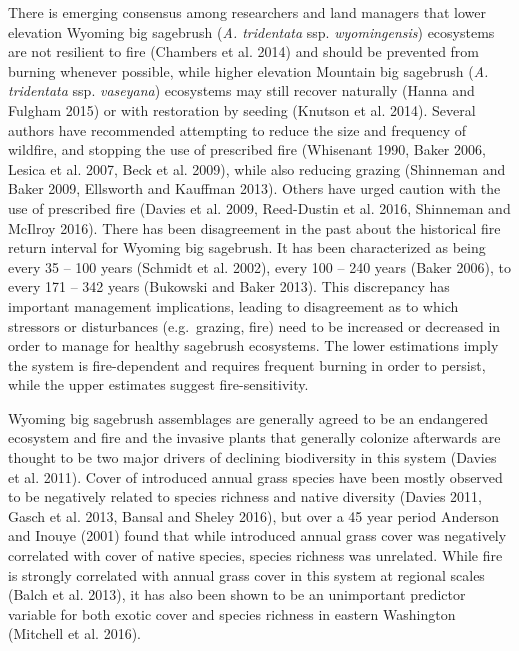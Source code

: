 \documentclass[12pt,]{article}
\begin{document}
There is emerging consensus among researchers and land managers that
lower elevation Wyoming big sagebrush (\emph{A. tridentata} ssp.
\emph{wyomingensis}) ecosystems are not resilient to fire (Chambers et
al. 2014) and should be prevented from burning whenever possible, while
higher elevation Mountain big sagebrush (\emph{A. tridentata} ssp.
\emph{vaseyana}) ecosystems may still recover naturally (Hanna and
Fulgham 2015) or with restoration by seeding (Knutson et al. 2014).
Several authors have recommended attempting to reduce the size and
frequency of wildfire, and stopping the use of prescribed fire
(Whisenant 1990, Baker 2006, Lesica et al. 2007, Beck et al. 2009),
while also reducing grazing (Shinneman and Baker 2009, Ellsworth and
Kauffman 2013). Others have urged caution with the use of prescribed
fire (Davies et al. 2009, Reed-Dustin et al. 2016, Shinneman and McIlroy
2016). There has been disagreement in the past about the historical fire
return interval for Wyoming big sagebrush. It has been characterized as
being every 35 -- 100 years (Schmidt et al. 2002), every 100 -- 240
years (Baker 2006), to every 171 -- 342 years (Bukowski and Baker 2013).
This discrepancy has important management implications, leading to
disagreement as to which stressors or disturbances (e.g.~grazing, fire)
need to be increased or decreased in order to manage for healthy
sagebrush ecosystems. The lower estimations imply the system is
fire-dependent and requires frequent burning in order to persist, while
the upper estimates suggest fire-sensitivity.

Wyoming big sagebrush assemblages are generally agreed to be an
endangered ecosystem and fire and the invasive plants that generally
colonize afterwards are thought to be two major drivers of declining
biodiversity in this system (Davies et al. 2011). Cover of introduced
annual grass species have been mostly observed to be negatively related
to species richness and native diversity (Davies 2011, Gasch et al.
2013, Bansal and Sheley 2016), but over a 45 year period Anderson and
Inouye (2001) found that while introduced annual grass cover was
negatively correlated with cover of native species, species richness was
unrelated. While fire is strongly correlated with annual grass cover in
this system at regional scales (Balch et al. 2013), it has also been
shown to be an unimportant predictor variable for both exotic cover and
species richness in eastern Washington (Mitchell et al. 2016).
\end{document}
